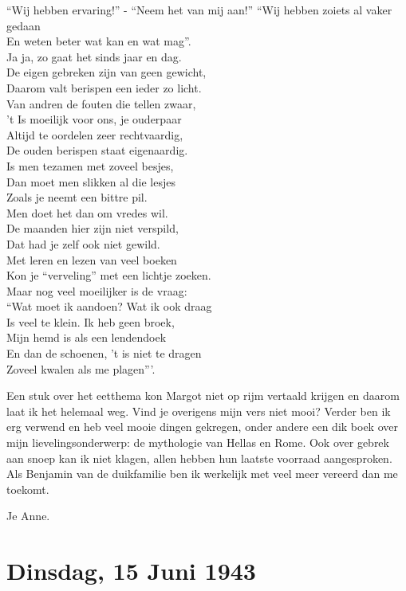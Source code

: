 \documentclass{book}
\begin{document}
``Wij hebben ervaring!'' - ``Neem het van mij aan!'' ``Wij hebben zoiets
al vaker gedaan\\En weten beter wat kan en wat mag''.\\Ja ja, zo gaat
het sinds jaar en dag.\\De eigen gebreken zijn van geen gewicht,\\Daarom
valt berispen een ieder zo licht.\\Van andren de fouten die tellen
zwaar,\\'t Is moeilijk voor ons, je ouderpaar\\Altijd te oordelen zeer
rechtvaardig,\\De ouden berispen staat eigenaardig.\\Is men tezamen met
zoveel besjes,\\Dan moet men slikken al die lesjes\\Zoals je neemt een
bittre pil.\\Men doet het dan om vredes wil.\\De maanden hier zijn niet
verspild,\\Dat had je zelf ook niet gewild.\\Met leren en lezen van veel
boeken\\Kon je ``verveling'' met een lichtje zoeken.\\Maar nog veel
moeilijker is de vraag:\\``Wat moet ik aandoen? Wat ik ook draag\\Is
veel te klein. Ik heb geen broek,\\Mijn hemd is als een lendendoek\\En
dan de schoenen, 't is niet te dragen\\Zoveel kwalen als me plagen'''.

Een stuk over het eetthema kon Margot niet op rijm vertaald krijgen en
daarom laat ik het helemaal weg. Vind je overigens mijn vers niet mooi?
Verder ben ik erg verwend en heb veel mooie dingen gekregen, onder
andere een dik boek over mijn lievelingsonderwerp: de mythologie van
Hellas en Rome. Ook over gebrek aan snoep kan ik niet klagen, allen
hebben hun laatste voorraad aangesproken. Als Benjamin van de
duikfamilie ben ik werkelijk met veel meer vereerd dan me toekomt.

Je Anne.

\chapter{Dinsdag, 15 Juni 1943}
\end{document}
